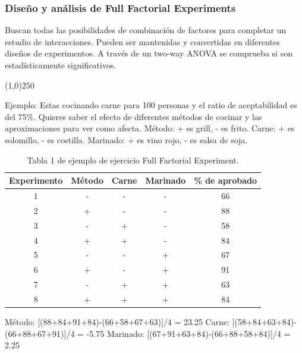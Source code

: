 \documentclass[]{article}
\begin{document}
\subsubsection{Diseño y análisis de Full Factorial Experiments}
Buscan todas las posibilidades de combinación de factores para completar un estudio de interacciones. Pueden ser mantenidas y convertidas en diferentes diseños de experimentos. A través de un two-way ANOVA se comprueba si son estadísticamente significativos.
\begin{center}
	\line(1,0){250}
\end{center}

Ejemplo: Estas cocinando carne para 100 personas y el ratio de aceptabilidad es del 75\%. Quieres saber el efecto de diferentes métodos de cocinar y las aproximaciones para ver como afecta.
Método: + es grill, - es frito. Carne: + es solomillo, - es costilla. Marinado: + es vino rojo, - es salsa de soja.

\begin{table}[H]
	\begin{center}
\begin{tabular}{|c|c|c|c|c|}
	\hline Experimento & Método & Carne & Marinado & \% de aprobado \\ 
	\hline 1 & - & - & - & 66 \\ 
	\hline 2 & + & - & - & 88 \\ 
	\hline 3 & - & + & - & 58 \\ 
	\hline 4 & + & + & - & 84 \\ 
	\hline 5 & - & - & + & 67 \\ 
	\hline 6 & + & - & + & 91 \\ 
	\hline 7 & - & + & + & 63 \\ 
	\hline 8 & + & + & + & 84 \\ 
	\hline 
\end{tabular} 
		\caption{Tabla 1 de ejemplo de ejercicio Full Factorial Experiment.}
		\end{center}
\end{table}

Método: [(88+84+91+84)-(66+58+67+63)]/4 = 23.25 \newline
Carne: [(58+84+63+84)-(66+88+67+91)]/4 = -5.75 \newline
Marinado: [(67+91+63+84)-(66+88+58+84)]/4 = 2.25
\end{document}
